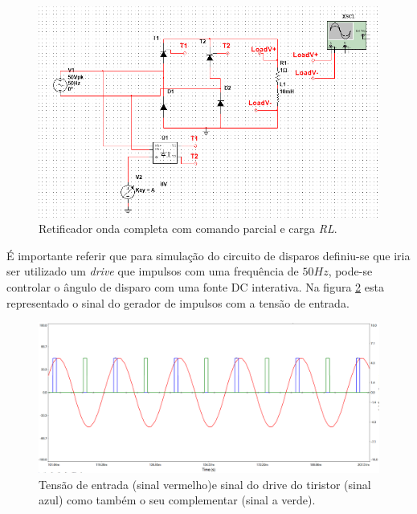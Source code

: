 \documentclass[a4paper,11pt]{article}
\numberwithin{equation}{section}
\begin{document}
\begin{figure}[h]
	\centering
	\includegraphics[keepaspectratio=true, scale=0.5]{img/circuito3}
	\caption{Retificador onda completa com comando parcial e carga \textit{RL}.}
	\label{fig:circuit_5}
	\vspace{-0.8em}
\end{figure}
\pagebreak 

É importante referir que para simulação do circuito de disparos definiu-se que iria ser utilizado um \textit{drive} que impulsos com uma frequência  de $50Hz$, pode-se controlar o ângulo de  disparo com uma fonte DC interativa. Na figura \ref{fig:circuit_6} esta representado o sinal do gerador de impulsos com a tensão de entrada.
\vspace{17mm}

\begin{figure}[h]
	\centering
	\includegraphics[keepaspectratio=true, scale=0.4]{img/circuito4}
	\caption{Tensão de entrada (sinal vermelho)e sinal do drive do tiristor (sinal azul) como também o seu complementar (sinal a verde).}
	\label{fig:circuit_6}
	\vspace{-0.8em}
\end{figure}
\end{document}

